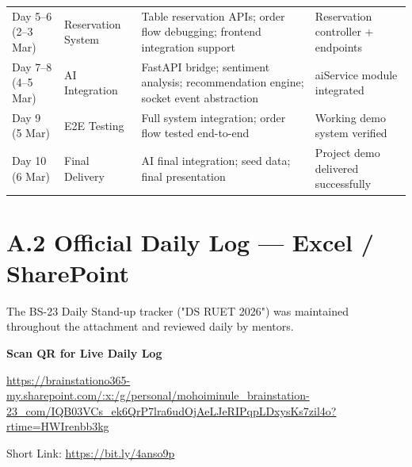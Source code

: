 \begin{longtable}{p{}p{}p{}p{}}
Day 5--6 (2--3 Mar) &
Reservation System &
Table reservation APIs; order flow debugging; frontend integration support &
Reservation controller + endpoints \\

Day 7--8 (4--5 Mar) &
AI Integration &
FastAPI bridge; sentiment analysis; recommendation engine; socket event abstraction &
aiService module integrated \\

Day 9 (5 Mar) &
E2E Testing &
Full system integration; order flow tested end-to-end &
Working demo system verified \\

Day 10 (6 Mar) &
Final Delivery &
AI final integration; seed data; final presentation &
Project demo delivered successfully \\

\hline
\end{longtable}

\vspace{1em}

\section*{A.2 Official Daily Log --- Excel / SharePoint}

The BS-23 Daily Stand-up tracker ("DS RUET 2026") was maintained throughout the attachment and reviewed daily by mentors.

\vspace{1em}

\begin{center}

\vspace{0.5em}

{\small \textbf{Scan QR for Live Daily Log}}

\vspace{0.5em}

{\footnotesize
\url{https://brainstationo365-my.sharepoint.com/:x:/g/personal/mohoiminule_brainstation-23_com/IQB03VCs_ek6QrP7lra6udOjAeLJeRIPqpLDxysKs7zil4o?rtime=HWIrenbb3kg}
}

\vspace{0.5em}

{\small Short Link: \url{https://bit.ly/4anso9p}}

\end{center}
